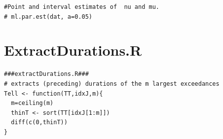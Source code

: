 \documentclass[honours,12pt]{unswthesis}
\newcommand{\1}{\mathbf 1}
\numberwithin{equation}{section}
\theoremstyle{definition}
\theoremstyle{remark}
\begin{document}
\begin{appendices}
\begin{lstlisting}
#Point and interval estimates of  nu and mu. 
# ml.par.est(dat, a=0.05)
\end{lstlisting}
\section{ExtractDurations.R}
\begin{lstlisting}
###extractDurations.R###
# extracts (preceding) durations of the m largest exceedances
Tell <- function(TT,idxJ,m){
  m=ceiling(m)
  thinT <- sort(TT[idxJ[1:m]])
  diff(c(0,thinT))
}
\end{lstlisting}

\end{appendices}

\clearpage
{}


\end{document}
